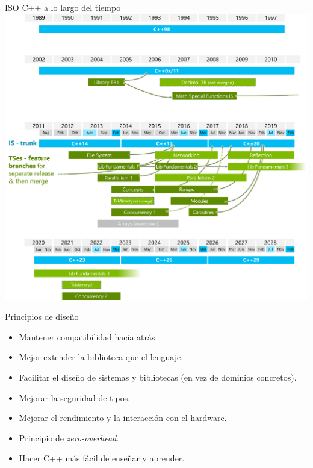 \begin{frame}{ISO C++ a lo largo del tiempo}
\centering
\includegraphics[height=.8\textheight]{img/wg21-timeline-2023.png}
\end{frame}

\begin{frame}[t]{Principios de diseño}
\begin{itemize}
  \item \pause  Mantener compatibilidad hacia atrás.
  \item \pause  Mejor extender la biblioteca que el lenguaje.
  \item \pause  Facilitar el diseño de sistemas y bibliotecas (en vez de dominios concretos).
  \item \pause  Mejorar la seguridad de tipos.
  \item \pause  Mejorar el rendimiento y la interacción con el hardware.
  \item \pause  Principio de \emph{zero-overhead}.
  \item \pause  Hacer C++ más fácil de enseñar y aprender.
\end{itemize}
\end{frame}

